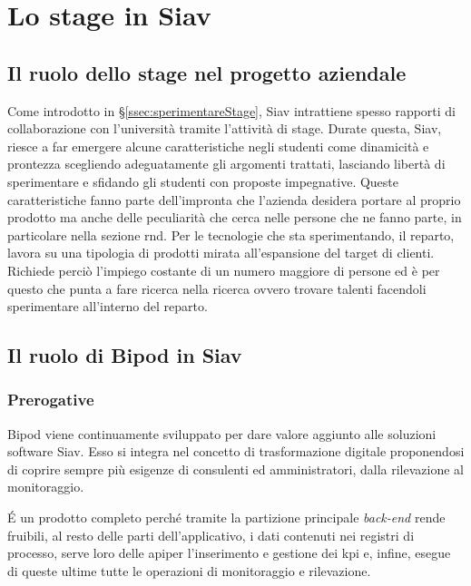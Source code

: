 
\chapter{Lo stage in Siav}
\label{cap:process-mining}
\section{Il ruolo dello stage nel progetto aziendale}
Come introdotto in \S\ref{ssec:sperimentareStage}, Siav intrattiene spesso rapporti di collaborazione con l'università tramite l'attività di stage.
Durate questa, Siav, riesce a far emergere alcune caratteristiche negli studenti come dinamicità e prontezza scegliendo adeguatamente gli argomenti trattati, lasciando libertà di sperimentare e sfidando gli studenti con proposte impegnative.
Queste caratteristiche fanno parte dell'impronta che l'azienda desidera portare al proprio prodotto ma anche delle peculiarità che cerca nelle persone che ne fanno parte, in particolare nella sezione \acrshort{rnd}.
Per le tecnologie che sta sperimentando, il reparto, lavora su una tipologia di prodotti mirata all'espansione del target di clienti. Richiede perciò l'impiego costante di un numero maggiore di persone ed è per questo che punta a fare ricerca nella ricerca ovvero trovare talenti facendoli sperimentare all'interno del reparto.
\section{Il ruolo di Bipod in Siav}
\subsection{Prerogative}
Bipod viene continuamente sviluppato per dare valore aggiunto alle soluzioni software Siav. Esso si integra nel concetto di trasformazione digitale proponendosi di coprire sempre più esigenze di consulenti ed amministratori, dalla rilevazione al monitoraggio.

\'E un prodotto completo perché tramite la partizione principale \textit{back-end} rende fruibili, al resto delle parti dell'applicativo, i dati contenuti nei registri di processo, serve loro delle \acrshort{api}\glsfirstoccur per l'inserimento e gestione dei \acrshort{kpi} e, infine, esegue di queste ultime tutte le operazioni di monitoraggio e rilevazione.

